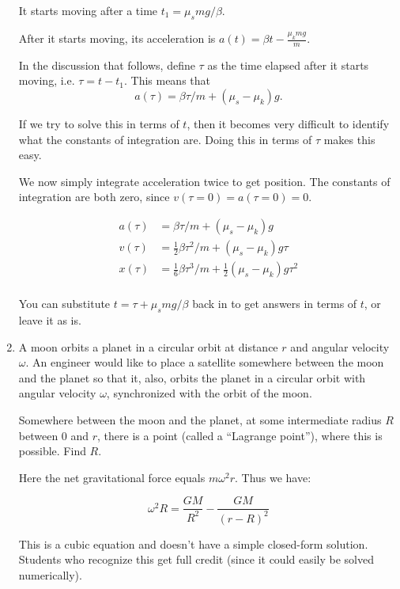 \documentclass[12pt]{article}
\newcommand{\black}{\color{Black}}
\newcommand{\red}{\color{Red}}
\begin{document}
\begin{enumerate}
\red

It starts moving after a time $t_1 = \mu_s mg/\beta$.

After it starts moving, its acceleration is $a(t) = \beta t - \frac{\mu_k mg}{m}$.

In the discussion that follows, define $\tau$ as the time elapsed after it starts moving,
i.e. $\tau = t - t_1$. This means that 
$$a(\tau) = \beta \tau/m + (\mu_s - \mu_k) g.$$

If we try to solve this in terms of $t$, then it becomes very difficult to identify what the constants
of integration are. Doing this in terms of $\tau$ makes this easy.

We now simply integrate acceleration twice to get position. The constants of integration are both zero, since
$v(\tau = 0) = a(\tau = 0) = 0$.

\begin{align*}
a(\tau) &= \beta \tau/m + (\mu_s - \mu_k) g \\
v(\tau) &= \frac{1}{2}\beta \tau^2/m + (\mu_s - \mu_k) g \tau \\
x(\tau) &= \frac{1}{6}\beta \tau^3/m + \frac{1}{2}(\mu_s - \mu_k) g \tau^2 \\
\end{align*}

You can substitute $t=\tau + \mu_smg/\beta$ back in to get answers in terms of $t$, or leave it as is.

\black



\item A moon orbits a planet in a circular orbit at distance $r$ and angular velocity $\omega$. An engineer would like to place a satellite somewhere between the moon and the planet so that it, 
also, orbits the planet in a circular orbit with angular velocity $\omega$, synchronized with the orbit of the moon. 

Somewhere between the moon and the planet, at some intermediate radius $R$ between 0 and $r$, there is a point (called a ``Lagrange point''), where this is possible. Find $R$. 


\red

Here the net gravitational force equals $m\omega^2 r$. Thus we have:

$$\omega^2 R = \frac{GM}{R^2} - \frac{GM}{(r-R)^2}$$

This is a cubic equation and doesn't have a simple closed-form solution. Students who recognize this
get full credit (since it could easily be solved numerically). 

\end{enumerate}
\end{document}
